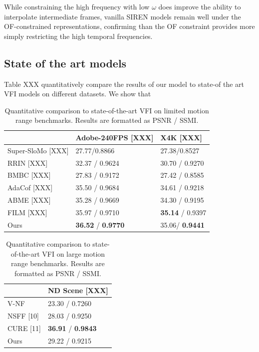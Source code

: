 \documentclass{article}
\begin{document}
While constraining the high frequency with low $\omega$ does improve the ability to interpolate intermediate frames,
vanilla SIREN models remain well under the OF-constrained representations,
confirming than the OF constraint provides more simply restricting the high temporal frequencies.

\subsection{State of the art models}
\label{sec_sota}
Table XXX quantitatively compare the results of our model to state-of the art VFI models on different datasets.
We show that


\begin{table}[]
\centering
\caption{Quantitative comparison to state-of-the-art VFI on limited motion range benchmarks. Results are formatted as PSNR / SSMI.}
\begin{tabular}{l | l | l }
 &  Adobe-240FPS  [XXX] &  X4K [XXX]  \\
\hline
Super-SloMo [XXX] &  27.77/0.8866 & 27.38/0.8527  \\
RRIN [XXX]  & 32.37 / 0.9624 & 30.70 / 0.9270  \\
BMBC [XXX]  & 27.83 / 0.9172 & 27.42 / 0.8585   \\
AdaCof [XXX] & 35.50 / 0.9684 & 34.61 / 0.9218 \\
ABME   [XXX] & 35.28 / 0.9669 & 34.30 / 0.9195 \\
FILM   [XXX] &	35.97 / 0.9710 & \textbf{35.14} / 0.9397 \\
Ours	& \textbf{36.52} / \textbf{0.9770} & 35.06/ \textbf{0.9441} \\
\end{tabular}
\end{table}



\begin{table}[]
\centering
\caption{Quantitative comparison to state-of-the-art VFI on large motion range benchmarks. Results are formatted as PSNR / SSMI.}
\begin{tabular}{l | l }
	    &   ND Scene [XXX] \\
\hline
V-NF        &  23.30 / 0.7260 \\
NSFF [10]   & 28.03 / 0.9250 \\
CURE [11]   & \textbf{36.91} / \textbf{0.9843} \\
Ours	      & 29.22 / 0.9215
\end{tabular}

\end{table}
\end{document}
